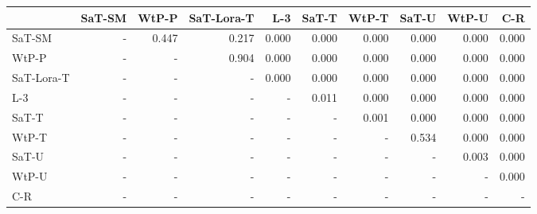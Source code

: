 \begin{tabular}{lrrrrrrrrr}
\toprule
 & SaT-SM & WtP-P & SaT-Lora-T & L-3 & SaT-T & WtP-T & SaT-U & WtP-U & C-R \\
\midrule
SaT-SM & - & 0.447 & 0.217 & 0.000 & 0.000 & 0.000 & 0.000 & 0.000 & 0.000 \\
WtP-P & - & - & 0.904 & 0.000 & 0.000 & 0.000 & 0.000 & 0.000 & 0.000 \\
SaT-Lora-T & - & - & - & 0.000 & 0.000 & 0.000 & 0.000 & 0.000 & 0.000 \\
L-3 & - & - & - & - & 0.011 & 0.000 & 0.000 & 0.000 & 0.000 \\
SaT-T & - & - & - & - & - & 0.001 & 0.000 & 0.000 & 0.000 \\
WtP-T & - & - & - & - & - & - & 0.534 & 0.000 & 0.000 \\
SaT-U & - & - & - & - & - & - & - & 0.003 & 0.000 \\
WtP-U & - & - & - & - & - & - & - & - & 0.000 \\
C-R & - & - & - & - & - & - & - & - & - \\
\bottomrule
\end{tabular}

